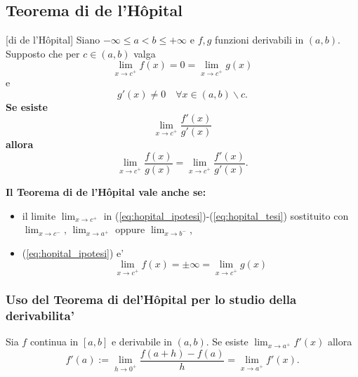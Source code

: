 \subsection{Teorema di de l'Hôpital}
\begin{theorem}\label{th:de_hopital}[di de l'Hôpital]
    Siano $-\infty\leq a<b\leq +\infty$ e $f,g$ funzioni derivabili in $(a,b)$. Supposto che per $c\in(a,b)$ valga
    \begin{equation}\label{eq:hopital_ipotesi}
        \lim_{x\rightarrow c^+}f(x)=0=\lim_{x\rightarrow c^+}g(x)
    \end{equation}
    e
    \begin{equation*}
        g'(x)\neq 0\quad\forall x\in(a,b)\backslash c.
    \end{equation*}
    \textbf{Se esiste}
    \begin{equation}\label{eq:hopital_ipotesi2}
        \lim_{x\rightarrow c^+}\frac{f'(x)}{g'(x)}
    \end{equation}
    \textbf{allora}
    \begin{equation}\label{eq:hopital_tesi}
        \lim_{x\rightarrow c^+}\frac{f(x)}{g(x)}=\lim_{x\rightarrow c^+}\frac{f'(x)}{g'(x)}.
    \end{equation}
\end{theorem}

\textbf{Il Teorema di de l'Hôpital vale anche se:}
\begin{itemize}
    \item il limite $\lim_{x\rightarrow c^+}$ in (\ref{eq:hopital_ipotesi})-(\ref{eq:hopital_tesi}) sostituito con $\lim_{x\rightarrow c^-},\,\lim_{x\rightarrow a^+}$ oppure $\lim_{x\rightarrow b^-}$,
    \item (\ref{eq:hopital_ipotesi}) e'
    \begin{equation*}
        \lim_{x\rightarrow c^+}f(x)=\pm\infty=\lim_{x\rightarrow c^+}g(x)
    \end{equation*}
\end{itemize}

\subsubsection{Uso del Teorema di del'Hôpital per lo studio della derivabilita'}
\begin{proposition}
    Sia $f$ continua in $[a,b]$ e derivabile in $(a,b)$. Se esiste $\lim_{x\rightarrow a^+}f'(x)$ allora
    \begin{equation*}
        f'(a):=\lim_{h\rightarrow 0^+}\frac{f(a+h)-f(a)}{h}=\lim_{x\rightarrow a^+}f'(x).
    \end{equation*}
\end{proposition}

